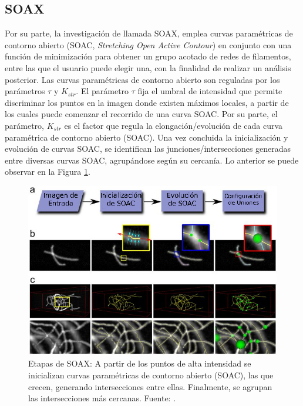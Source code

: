 \subsection{SOAX}
Por su parte, la investigaci\'on de \citet{xu2015soax} llamada SOAX, emplea curvas param\'etricas de contorno abierto (SOAC, {\it Stretching Open Active Contour}) en conjunto con una funci\'on de minimizaci\'on para obtener un grupo acotado de redes de filamentos, entre las que el usuario puede elegir una, con la finalidad de realizar un an\'alisis posterior. Las curvas param\'etricas de contorno abierto son reguladas por los par\'ametros $\tau$ y $K_{str}$. El par\'ametro $\tau$ fija el umbral de intensidad que permite discriminar los puntos en la imagen donde existen m\'aximos locales, a partir de los cuales puede comenzar el recorrido de una curva SOAC.
Por su parte, el par\'ametro, $K_{str}$ es el factor que regula la elongaci\'on/evoluci\'on de cada curva param\'etrica de contorno abierto (SOAC). Una vez concluida la inicializaci\'on y evoluci\'on de curvas SOAC, se identifican las junciones/intersecciones generadas entre diversas curvas SOAC, agrup\'andose seg\'un su cercan\'ia. Lo anterior se puede observar en la Figura \ref{fig:SOAX}.

\begin{figure}[h]
        \includegraphics[scale=0.7]{imagenes/SOAX_translated.png}
        \caption[Etapas de SOAX.]{Etapas de SOAX: A partir de los puntos de alta intensidad se inicializan curvas param\'etricas de contorno abierto (SOAC), las que crecen, generando intersecciones entre ellas. Finalmente, se agrupan las intersecciones más cercanas. Fuente: \citet{xu2015soax}.}
        \label{fig:SOAX}
\end{figure}

